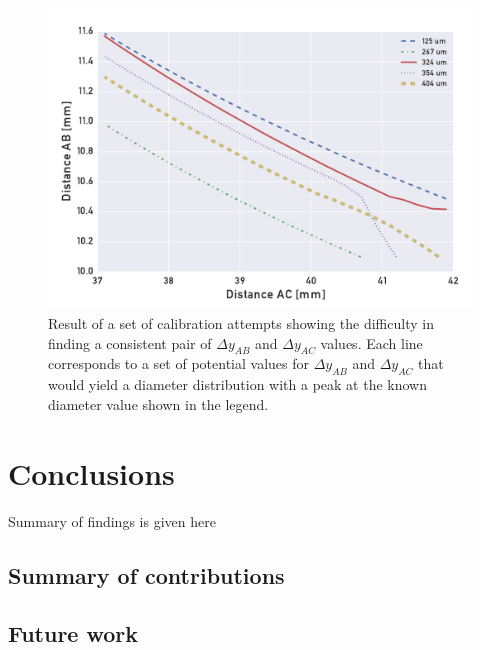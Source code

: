 \documentclass[11.5pt,oneside]{book}
\begin{document}
\begin{figure}
    \centering
    \includegraphics[width=\textwidth]{img/pdpa/all-coinc-AB-AC-zerorelations.pdf}
    \caption{Result of a set of calibration attempts showing the difficulty in
            finding a consistent pair of $\Delta y_{AB}$ and $\Delta y_{AC}$
            values. Each line corresponds to a set of potential values for
    $\Delta y_{AB}$ and $\Delta y_{AC}$ that would yield a diameter distribution
    with a peak at the known diameter value shown in the legend.
    \label{fig:pdpa-zerorelations}}
\end{figure}

\chapter{Conclusions}
Summary of findings is given here

\section{Summary of contributions}

\section{Future work}



\end{document}
